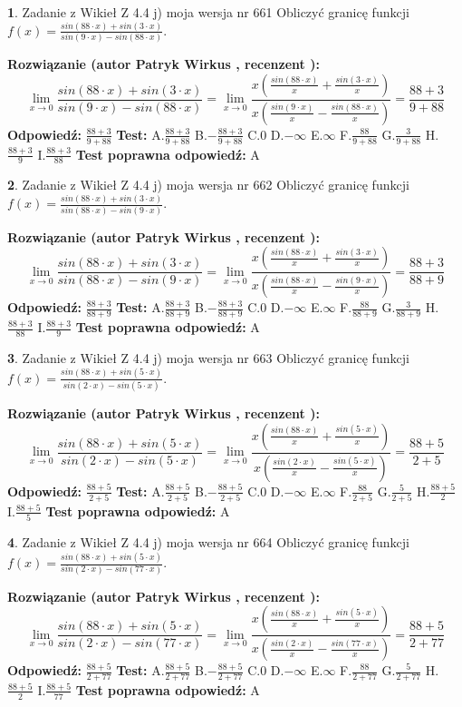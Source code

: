 \documentclass[12pt, a4paper]{article}
\theoremstyle{definition} %
\newtheorem{zad}{}
\newcommand{\zadStart}[1]{\begin{zad}#1\newline}
\newcommand{\zadStop}{\end{zad}}
\newcommand{\rozwStart}[2]{\noindent \textbf{Rozwiązanie (autor #1 , recenzent #2): }\newline}
\newcommand{\rozwStop}{\newline}
\newcommand{\odpStart}{\noindent \textbf{Odpowiedź:}\newline}
\newcommand{\odpStop}{\newline}
\newcommand{\testStart}{\noindent \textbf{Test:}\newline}
\newcommand{\testStop}{\newline}
\newcommand{\kluczStart}{\noindent \textbf{Test poprawna odpowiedź:}\newline}
\newcommand{\kluczStop}{\newline}
\begin{document}
\zadStart{Zadanie z Wikieł Z 4.4 j) moja wersja nr 661}
Obliczyć granicę funkcji $f(x)=\frac{sin(88\cdot x) +sin(3\cdot x)}{sin(9\cdot x) -sin(88\cdot x)}$.
\zadStop
\rozwStart{Patryk Wirkus}{}
$$\lim\limits_{x\to 0}\frac{sin(88\cdot x) +sin(3\cdot x)}{sin(9\cdot x) -sin(88\cdot x)}=\lim\limits_{x\to 0}\frac{x(\frac{sin(88\cdot x)}{x}+\frac{sin(3\cdot x)}{x})}{x(\frac{sin(9\cdot x)}{x}-\frac{sin(88\cdot x)}{x})}=\frac{88+3}{9+88}$$
\rozwStop
\odpStart
$\frac{88+3}{9+88}$
\odpStop
\testStart
A.$\frac{88+3}{9+88}$
B.$-\frac{88+3}{9+88}$
C.$0$
D.$-\infty$
E.$\infty$
F.$\frac{88}{9+88}$
G.$\frac{3}{9+88}$
H.$\frac{88+3}{9}$
I.$\frac{88+3}{88}$
\testStop
\kluczStart
A
\kluczStop



\zadStart{Zadanie z Wikieł Z 4.4 j) moja wersja nr 662}
Obliczyć granicę funkcji $f(x)=\frac{sin(88\cdot x) +sin(3\cdot x)}{sin(88\cdot x) -sin(9\cdot x)}$.
\zadStop
\rozwStart{Patryk Wirkus}{}
$$\lim\limits_{x\to 0}\frac{sin(88\cdot x) +sin(3\cdot x)}{sin(88\cdot x) -sin(9\cdot x)}=\lim\limits_{x\to 0}\frac{x(\frac{sin(88\cdot x)}{x}+\frac{sin(3\cdot x)}{x})}{x(\frac{sin(88\cdot x)}{x}-\frac{sin(9\cdot x)}{x})}=\frac{88+3}{88+9}$$
\rozwStop
\odpStart
$\frac{88+3}{88+9}$
\odpStop
\testStart
A.$\frac{88+3}{88+9}$
B.$-\frac{88+3}{88+9}$
C.$0$
D.$-\infty$
E.$\infty$
F.$\frac{88}{88+9}$
G.$\frac{3}{88+9}$
H.$\frac{88+3}{88}$
I.$\frac{88+3}{9}$
\testStop
\kluczStart
A
\kluczStop



\zadStart{Zadanie z Wikieł Z 4.4 j) moja wersja nr 663}
Obliczyć granicę funkcji $f(x)=\frac{sin(88\cdot x) +sin(5\cdot x)}{sin(2\cdot x) -sin(5\cdot x)}$.
\zadStop
\rozwStart{Patryk Wirkus}{}
$$\lim\limits_{x\to 0}\frac{sin(88\cdot x) +sin(5\cdot x)}{sin(2\cdot x) -sin(5\cdot x)}=\lim\limits_{x\to 0}\frac{x(\frac{sin(88\cdot x)}{x}+\frac{sin(5\cdot x)}{x})}{x(\frac{sin(2\cdot x)}{x}-\frac{sin(5\cdot x)}{x})}=\frac{88+5}{2+5}$$
\rozwStop
\odpStart
$\frac{88+5}{2+5}$
\odpStop
\testStart
A.$\frac{88+5}{2+5}$
B.$-\frac{88+5}{2+5}$
C.$0$
D.$-\infty$
E.$\infty$
F.$\frac{88}{2+5}$
G.$\frac{5}{2+5}$
H.$\frac{88+5}{2}$
I.$\frac{88+5}{5}$
\testStop
\kluczStart
A
\kluczStop



\zadStart{Zadanie z Wikieł Z 4.4 j) moja wersja nr 664}
Obliczyć granicę funkcji $f(x)=\frac{sin(88\cdot x) +sin(5\cdot x)}{sin(2\cdot x) -sin(77\cdot x)}$.
\zadStop
\rozwStart{Patryk Wirkus}{}
$$\lim\limits_{x\to 0}\frac{sin(88\cdot x) +sin(5\cdot x)}{sin(2\cdot x) -sin(77\cdot x)}=\lim\limits_{x\to 0}\frac{x(\frac{sin(88\cdot x)}{x}+\frac{sin(5\cdot x)}{x})}{x(\frac{sin(2\cdot x)}{x}-\frac{sin(77\cdot x)}{x})}=\frac{88+5}{2+77}$$
\rozwStop
\odpStart
$\frac{88+5}{2+77}$
\odpStop
\testStart
A.$\frac{88+5}{2+77}$
B.$-\frac{88+5}{2+77}$
C.$0$
D.$-\infty$
E.$\infty$
F.$\frac{88}{2+77}$
G.$\frac{5}{2+77}$
H.$\frac{88+5}{2}$
I.$\frac{88+5}{77}$
\testStop
\kluczStart
A
\kluczStop
\end{document}
